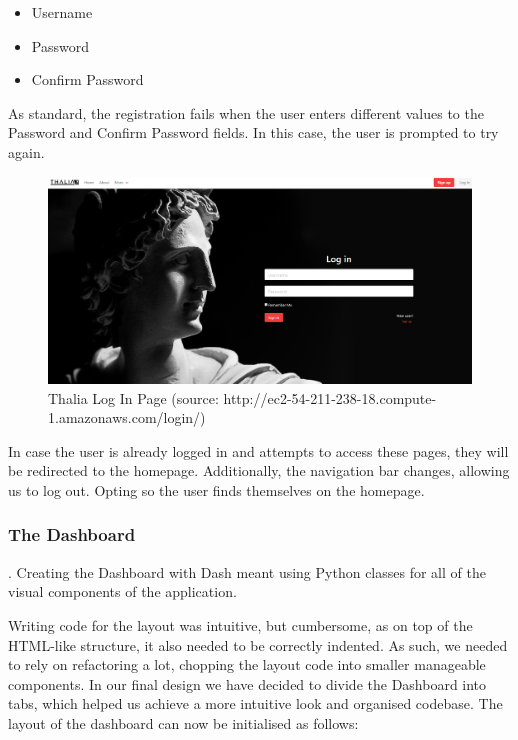 \documentclass[main.tex]{subfiles}
\begin{document}
\begin{itemize}
    \item Username
    \item Password
    \item Confirm Password
\end{itemize}

As standard, the registration fails when the user enters different values to the Password and Confirm Password fields. In this case, the user is prompted to try again.

\begin{figure}[H]
   \centering
   \includegraphics[width=\textwidth]{08Appendices/081User/081Pictures/login.png}
   \caption{Thalia Log In Page (source: http://ec2-54-211-238-18.compute-1.amazonaws.com/login/)}
   \label{thalia_login}
\end{figure}

In case the user is already logged in and attempts to access these pages, they will be redirected to the homepage. Additionally, the navigation bar changes, allowing us to log out. Opting so the user finds themselves on the homepage.

\subsubsection{The Dashboard}

 \cite{dash_layout}. Creating the Dashboard with Dash meant using Python classes for all of the visual components of the application. 

Writing code for the layout was intuitive, but cumbersome, as on top of the HTML-like structure, it also needed to be correctly indented. As such, we needed to rely on refactoring a lot, chopping the layout code into smaller manageable components. In our final design we have decided to divide the Dashboard into tabs, which helped us achieve a more intuitive look and organised codebase. The layout of the dashboard can now be initialised as follows:
\end{document}
